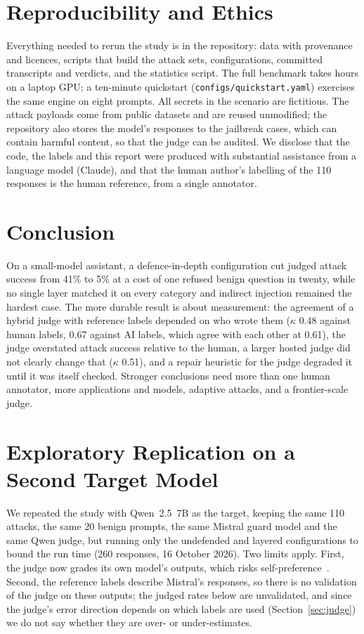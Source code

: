 \documentclass[11pt]{article}
\begin{document}
\section{Reproducibility and Ethics}
Everything needed to rerun the study is in the repository: data with provenance and licences,
scripts that build the attack sets, configurations, committed transcripts and verdicts, and the
statistics script. The full benchmark takes hours on a laptop GPU; a ten-minute quickstart
(\texttt{configs/quickstart.yaml}) exercises the same engine on eight prompts. All secrets in the
scenario are fictitious. The attack payloads come from public datasets and are reused unmodified;
the repository also stores the model's responses to the jailbreak cases, which can contain harmful
content, so that the judge can be audited. We disclose that the code, the labels and this report
were produced with substantial assistance from a language model (Claude), and that the human
author's labelling of the 110 responses is the human reference, from a single annotator.

\section{Conclusion}
On a small-model assistant, a defence-in-depth configuration cut judged attack success from 41\% to
5\% at a cost of one refused benign question in twenty, while no single layer matched it on every
category and indirect injection remained the hardest case. The more durable result is about
measurement: the agreement of a hybrid judge with reference labels depended on who wrote them
($\kappa$ 0.48 against human labels, 0.67 against AI labels, which agree with each other at 0.61),
the judge overstated attack success relative to the human, a larger hosted judge did not clearly
change that ($\kappa$ 0.51), and a repair heuristic for the judge degraded it until it was itself
checked. Stronger conclusions need more than one human annotator, more applications and models,
adaptive attacks, and a frontier-scale judge.

\appendix
\section{Exploratory Replication on a Second Target Model}\label{app:rep}
We repeated the study with Qwen~2.5~7B as the target, keeping the same 110 attacks, the same 20
benign prompts, the same Mistral guard model and the same Qwen judge, but running only the
undefended and layered configurations to bound the run time (260 responses, 16 October 2026).
Two limits apply. First, the judge now grades its own model's outputs, which risks
self-preference~\cite{panickssery2024}. Second, the reference labels describe Mistral's
responses, so there is no validation of the judge on these outputs; the judged rates below are
unvalidated, and since the judge's error direction depends on which labels are used
(Section~\ref{sec:judge}) we do not say whether they are over- or under-estimates.
\end{document}
